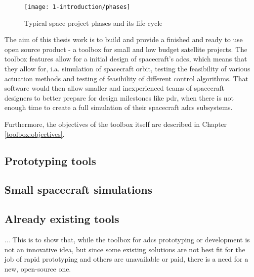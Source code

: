     \begin{figure}[H]
        \centering
        \texttt{[image: 1-introduction/phases]}
        \caption{Typical space project phases and its life cycle\cite{nguyen2000effective}}
        \label{fig:phases}
    \end{figure}

    The aim of this thesis work is to build and provide a finished and ready to use open source product - a toolbox for small and low budget satellite projects.  The toolbox features allow for a initial design of spacecraft's \ac{adcs}, which means that they allow for, i.a. simulation of spacecraft orbit, testing the feasibility of various actuation methods and testing of feasibility of different control algorithms.  That software would then allow smaller and inexperienced teams of spacecraft designers to better prepare for design milestones like \ac{pdr}, when there is not enough time to create a full simulation of their spacecraft \ac{adcs} subsystems.
    \\

    Furthermore, the objectives of the toolbox itself are described in Chapter \ref{toolbox:objectives}.



\subsection{Prototyping tools}

\subsection{Small spacecraft simulations}

\subsection{Already existing tools}
    ... This is to show that, while the toolbox for \ac{adcs} prototyping or development is not an innovative idea, but since some existing solutions are not best fit for the job of rapid prototyping and others are unavailable or paid, there is a need for a new, open-source one.
    
